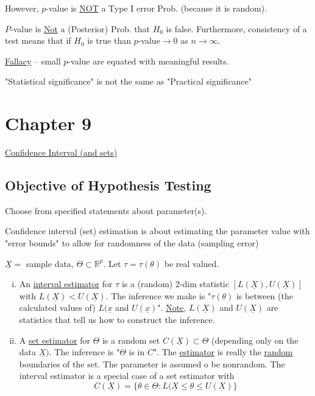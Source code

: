 \documentclass[english, 11pt]{article}
\begin{document}
However, $p$-value is \underline{NOT} a Type I error Prob. (because it is random).

$P$-value is \underline{Not} a (Posterior) Prob. that $H_0$ is false. Furthermore, consistency of a test means that if $H_0$ is true than $p$-value$\rightarrow$0 as $n\rightarrow\infty$.

\underline{Fallacy} -- small $p$-value are equated with meaningful results.

"Statistical significance" is not the same as "Practical significance"


\section{Chapter 9}
\underline{Confidence Interval (and sets)}

\subsection{Objective of Hypothesis Testing}

Choose from specified statements about parameter(s).

Confidence interval (set) estimation is about estimating the parameter value with "error bounds" to allow for randomness of the data (sampling error)

\begin{defn}\label{defn:61}
$\underline{X}=$ sample data, $\Theta\subset \mathbb{R}^p$. Let $\tau=\tau(\theta)$ be real valued.
\begin{enumerate}[i)]
\item An \underline{interval estimator} for $\tau$ is a (random) 2-dim statistic $[L(\underline{X}), U(\underline{X})]$ with $L(\underline{X})<U(\underline{X})$. The inference we make is "$\tau(\theta)$ is between (the calculated values of) $L(\underline{x}$ and $U(\underline{x})$". \underline{Note}, $L(\underline{X})$ and $U(\underline{X})$ are statistics that tell us how to construct the inference.
\item A \underline{set estimator} for $\Theta$ is a random set $C(\underline{X})\subset\Theta$ (depending only on the data $\underline{X})$. The inference is "$\Theta$ is in $C$". The \underline{estimator} is really the \underline{random}  boundaries of the set. The parameter is assumed o be nonrandom. The interval estimator is a special case of a set estimator with 
$$
C(\underline{X})=\{\theta\in\Theta:L(\underline{X}\leqslant\theta\leq U(\underline{X})\}
$$
\end{enumerate}
\end{defn}
\end{document}
